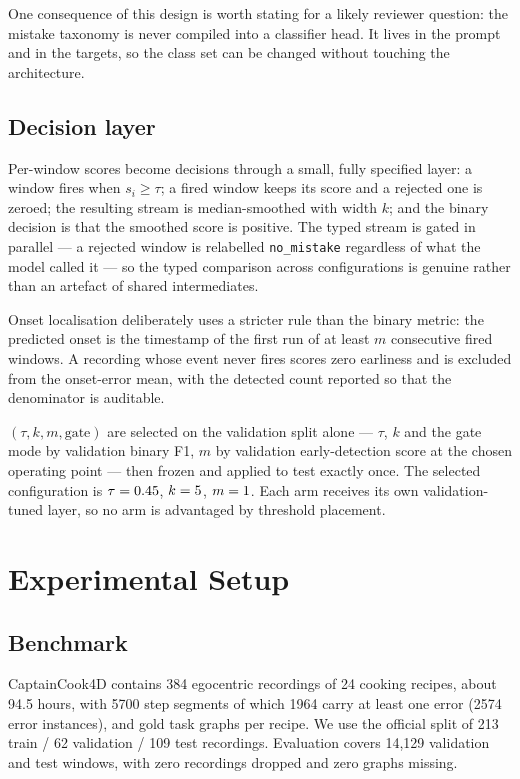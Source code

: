 \documentclass[10pt,twocolumn]{article}
\begin{document}
One consequence of this design is worth stating for a likely reviewer question:
the mistake taxonomy is never compiled into a classifier head. It lives in the
prompt and in the targets, so the class set can be changed without touching the
architecture.

\subsection{Decision layer}
\label{sec:decision}

Per-window scores become decisions through a small, fully specified layer: a
window fires when $s_i\ge\tau$; a fired window keeps its score and a rejected one
is zeroed; the resulting stream is median-smoothed with width $k$; and the binary
decision is that the smoothed score is positive. The typed stream is gated in
parallel --- a rejected window is relabelled \texttt{no\_mistake} regardless of
what the model called it --- so the typed comparison across configurations is
genuine rather than an artefact of shared intermediates.

Onset localisation deliberately uses a stricter rule than the binary metric: the
predicted onset is the timestamp of the first run of at least $m$ consecutive
fired windows. A recording whose event never fires scores zero earliness and is
excluded from the onset-error mean, with the detected count reported so that the
denominator is auditable.

$(\tau,k,m,\text{gate})$ are selected on the validation split alone --- $\tau$,
$k$ and the gate mode by validation binary F1, $m$ by validation early-detection
score at the chosen operating point --- then frozen and applied to test exactly
once. The selected configuration is $\tau=0.45$, $k=5$, $m=1$.
Each arm receives its own validation-tuned layer, so no arm is advantaged by
threshold placement.

\section{Experimental Setup}
\label{sec:setup}

\subsection{Benchmark}
CaptainCook4D \citep{peddi2024captaincook4d} contains 384 egocentric recordings
of 24 cooking recipes, about 94.5 hours, with 5700 step segments of which 1964
carry at least one error (2574 error instances), and gold task graphs per recipe.
We use the official split of 213 train / 62 validation / 109 test recordings.
Evaluation covers 14{,}129 validation and \resWindows{} test windows, with zero
recordings dropped and zero graphs missing.
\end{document}
